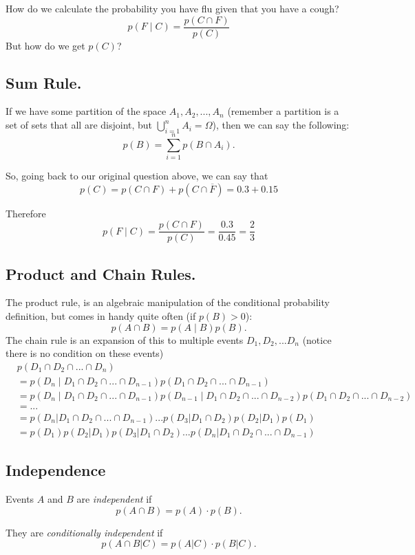 How do we calculate the probability you have flu given that you have a cough? 
\[p(F \mid C) = \frac{p(C \cap F)}{p(C)}\]
But how do we get $p(C)$?

\subsection{Sum Rule.}
If we have some partition of the space $A_1, A_2,..., A_n$
(remember a partition is a set of sets that all are disjoint, but $\bigcup_{i=1}^nA_i=\Omega$), 
then we can say the following: 
\[p(B) = \sum_{i=1}^n p(B\cap A_i).\]

So, going back to our original question above, 
we can say that 
\[p(C) = p(C \cap F) + p(C \cap \overline{F}) = 0.3 + 0.15\]

Therefore 
\[p(F \mid C) = \frac{p(C \cap F)}{p(C)} = \frac{0.3}{0.45} = \frac{2}{3}\]

\subsection{Product and Chain Rules.}
The product rule, is an algebraic manipulation of the conditional probability definition, but comes in handy quite often (if $p(B)>0$):
\[p(A\cap B) = p(A\mid B)p(B).\]
The chain rule is an expansion of this to multiple events $D_1,D_2,...D_n$ (notice there is no condition on these events)
\begin{align*}
&p(D_1 \cap D_2 \cap ... \cap D_n)\\
&= p(D_n \mid D_1 \cap D_2 \cap ... \cap D_{n-1})p(D_1 \cap D_2 \cap ... \cap D_{n-1})\\
& = p(D_n \mid D_1 \cap D_2 \cap ... \cap D_{n-1}) p(D_{n-1} \mid D_1 \cap D_2 \cap ... \cap D_{n-2})p(D_1 \cap D_2 \cap ... \cap D_{n-2})\\
& = ...\\
& = p(D_n| D_1 \cap D_2 \cap ... \cap D_{n-1})...p(D_3|D_1\cap D_2)p(D_2 | D_1)p(D_1)\\
& = p(D_1)p(D_2 | D_1)p(D_3|D_1\cap D_2)...p(D_n| D_1 \cap D_2 \cap ... \cap D_{n-1})
\end{align*}

\subsection{Independence} 
Events $A$ and $B$ are \emph{independent} if \[p(A\cap B) = p(A)\cdot p(B).\]

They are \emph{conditionally independent} if \[p(A\cap B|C) = p(A|C)\cdot p(B|C).\]

